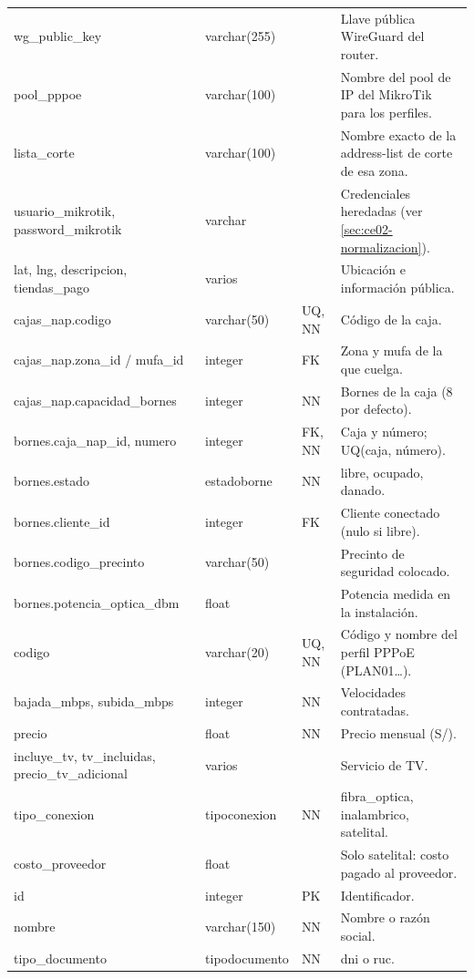 {\begin{longtable}{L{3.4cm}L{2.5cm}L{1.4cm}L{6.4cm}}
wg\_public\_key & varchar(255) & & Llave pública WireGuard del router. \\
pool\_pppoe & varchar(100) & & Nombre del pool de IP del MikroTik para los perfiles. \\
lista\_corte & varchar(100) & & Nombre exacto de la address-list de corte de esa zona. \\
usuario\_mikrotik, password\_mikrotik & varchar & & Credenciales heredadas (ver \cref{sec:ce02-normalizacion}). \\
lat, lng, descripcion, tiendas\_pago & varios & & Ubicación e información pública. \\
cajas\_nap.codigo & varchar(50) & UQ, NN & Código de la caja. \\
cajas\_nap.zona\_id / mufa\_id & integer & FK & Zona y mufa de la que cuelga. \\
cajas\_nap.capacidad\_bornes & integer & NN & Bornes de la caja (8 por defecto). \\
bornes.caja\_nap\_id, numero & integer & FK, NN & Caja y número; UQ(caja, número). \\
bornes.estado & estadoborne & NN & libre, ocupado, danado. \\
bornes.cliente\_id & integer & FK & Cliente conectado (nulo si libre). \\
bornes.codigo\_precinto & varchar(50) & & Precinto de seguridad colocado. \\
bornes.potencia\_optica\_dbm & float & & Potencia medida en la instalación. \\
codigo & varchar(20) & UQ, NN & Código y nombre del perfil PPPoE (PLAN01\ldots). \\
bajada\_mbps, subida\_mbps & integer & NN & Velocidades contratadas. \\
precio & float & NN & Precio mensual (S/). \\
incluye\_tv, tv\_incluidas, precio\_tv\_adicional & varios & & Servicio de TV. \\
tipo\_conexion & tipoconexion & NN & fibra\_optica, inalambrico, satelital. \\
costo\_proveedor & float & & Solo satelital: costo pagado al proveedor. \\
id & integer & PK & Identificador. \\
nombre & varchar(150) & NN & Nombre o razón social. \\
tipo\_documento & tipodocumento & NN & dni o ruc. \\

\end{longtable}}
